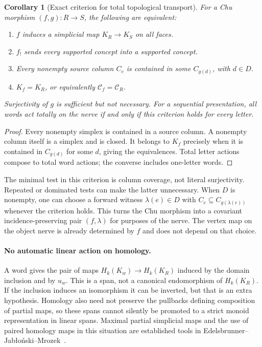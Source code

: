 \documentclass[11pt]{article}
\newtheorem{corollary}[theorem]{Corollary}
\theoremstyle{remark}
\begin{document}
\begin{corollary}[Exact criterion for total topological transport]
\label{nb:total-criterion}
For a Chu morphism $(f,g):R\to S$, the following are equivalent:
\begin{enumerate}
\item $f$ induces a simplicial map $K_R\to K_S$ on all faces.
\item $f_!$ sends every supported concept into a supported concept.
\item Every nonempty source column $C_e$ is contained in some
$C_{g(d)}$, with $d\in D$.
\item $K_f=K_R$, or equivalently $\mathcal C_f=\mathcal C_R$.
\end{enumerate}
Surjectivity of $g$ is sufficient but not necessary. For a sequential
presentation, all words act totally on the nerve if and only if this
criterion holds for every letter.
\end{corollary}
\begin{proof}
Every nonempty simplex is contained in a source column. A nonempty column itself
is a simplex and is closed. It belongs to $K_f$ precisely when it is
contained in $C_{g(d)}$ for some $d$, giving the equivalences. Total
letter actions compose to total word actions; the converse includes
one-letter words.
\end{proof}

The minimal test in this criterion is column coverage, not literal
surjectivity. Repeated or dominated tests can make the latter unnecessary.
When $D$ is nonempty, one can choose a forward witness $\lambda(e)\in D$ with
$C_e\subseteq C_{g(\lambda(e))}$ whenever the criterion holds. This
turns the Chu morphism into a covariant incidence-preserving pair
$(f,\lambda)$ for purposes of the nerve. The vertex map on the object
nerve is already determined by $f$ and does not depend on that choice.


\paragraph{No automatic linear action on homology.}
A word gives the pair of maps $H_k(K_w)\to H_k(K_R)$ induced by the
domain inclusion and by $u_w$. This is a span, not a canonical
endomorphism of $H_k(K_R)$. If the inclusion induces an isomorphism it
can be inverted, but that is an extra hypothesis. Homology also need not
preserve the pullbacks defining composition of partial maps, so these
spans cannot silently be promoted to a strict monoid representation in
linear spans. Maximal partial simplicial maps and the use of paired
homology maps in this situation are established tools in
Edelsbrunner--Jab\l o\'nski--Mrozek~\cite{cg:selfmap}.
\end{document}

